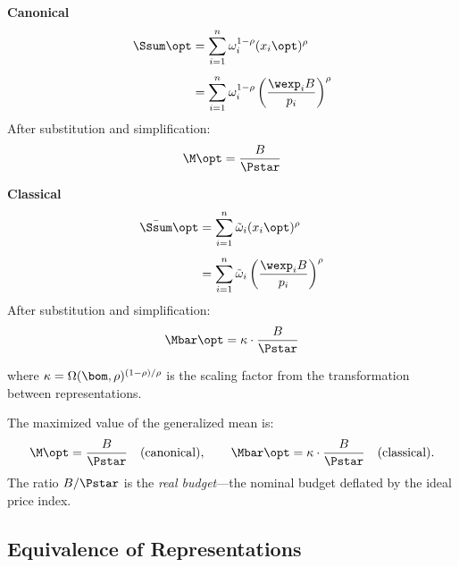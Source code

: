\medskip
\noindent
\begin{minipage}[t]{0.48\textwidth}
\centering\textbf{Canonical}
\begin{align}
\Ssum\opt &= \sum_{i=1}^{n} \omega_i^{1-\rho} (x_i\opt)^{\rho} \notag \\[4pt]
&= \sum_{i=1}^{n} \omega_i^{1-\rho} \left(\frac{\wexp_i B}{p_i}\right)^{\rho}
\label{eq:Sopt-canonical}
\end{align}
After substitution and simplification:
\begin{equation}
\M\opt = \frac{B}{\Pstar}
\label{eq:value-canonical}
\end{equation}
\end{minipage}%
\hfill
\begin{minipage}[t]{0.48\textwidth}
\centering\textbf{Classical}
\begin{align}
\bar{\Ssum}\opt &= \sum_{i=1}^{n} \tilde{\omega}_i (x_i\opt)^{\rho} \notag \\[4pt]
&= \sum_{i=1}^{n} \tilde{\omega}_i \left(\frac{\wexp_i B}{p_i}\right)^{\rho}
\label{eq:Sopt-classical}
\end{align}
After substitution and simplification:
\begin{equation}
\Mbar\opt = \kappa \cdot \frac{B}{\Pstar}
\label{eq:value-classical}
\end{equation}
\end{minipage}

\medskip
\noindent
where $\kappa = \Omega(\bom, \rho)^{(1-\rho)/\rho}$ is the scaling factor from the transformation between representations.

\begin{proposition}
\label{prop:value}
The maximized value of the generalized mean is:
\begin{equation}
\M\opt = \frac{B}{\Pstar} \quad \text{(canonical)}, \qquad \Mbar\opt = \kappa \cdot \frac{B}{\Pstar} \quad \text{(classical)}.
\label{eq:value-both}
\end{equation}
The ratio $B/\Pstar$ is the \emph{real budget}---the nominal budget deflated by the ideal price index.
\end{proposition}

\subsection{Equivalence of Representations}
\label{subsec:equivalence}

